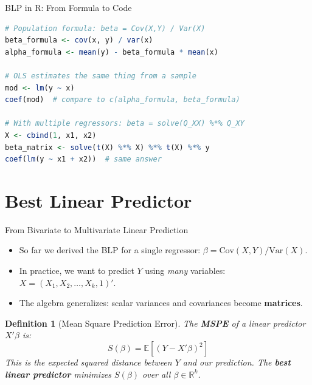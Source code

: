 \documentclass[aspectratio=169, handout, t]{beamer}
\newtheorem{defn}{Definition}
\numberwithin{equation}{section}
\begin{document}
\begin{frame}[fragile]{BLP in R: From Formula to Code}
\begin{lstlisting}[language=R]
# Population formula: beta = Cov(X,Y) / Var(X)
beta_formula <- cov(x, y) / var(x)
alpha_formula <- mean(y) - beta_formula * mean(x)

# OLS estimates the same thing from a sample
mod <- lm(y ~ x)
coef(mod)  # compare to c(alpha_formula, beta_formula)

# With multiple regressors: beta = solve(Q_XX) %*% Q_XY
X <- cbind(1, x1, x2)
beta_matrix <- solve(t(X) %*% X) %*% t(X) %*% y
coef(lm(y ~ x1 + x2))  # same answer
\end{lstlisting}
\end{frame}


\section{Best Linear Predictor}

\begin{frame}{From Bivariate to Multivariate Linear Prediction}
\begin{itemize}
\item So far we derived the BLP for a single regressor: $\beta = \text{Cov}(X,Y)/\text{Var}(X)$.
\item In practice, we want to predict $Y$ using \emph{many} variables: $X = (X_1, X_2, \ldots, X_k, 1)'$.
\item The algebra generalizes: scalar variances and covariances become \textbf{matrices}.
\end{itemize}
\bigskip\pause
\begin{defn}[Mean Square Prediction Error]
The \textbf{MSPE} of a linear predictor $X'\beta$ is:
$$S(\beta) = \mathbb{E}\!\left[(Y - X'\beta)^2\right]$$
This is the expected squared distance between $Y$ and our prediction.  The \textbf{best linear predictor} minimizes $S(\beta)$ over all $\beta \in \mathbb{R}^k$.
\end{defn}
\end{frame}
\end{document}
